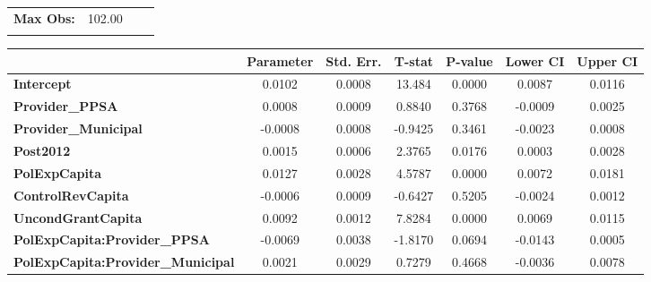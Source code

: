 \begin{center}
\begin{tabular}{lclc}
\textbf{Max Obs:}                                  &       102.00       & \textbf{                     }   &                  \\
\textbf{}                                          &                    & \textbf{                     }   &                  \\
\bottomrule
\end{tabular}
\begin{tabular}{lcccccc}
                                                   & \textbf{Parameter} & \textbf{Std. Err.} & \textbf{T-stat} & \textbf{P-value} & \textbf{Lower CI} & \textbf{Upper CI}  \\
\midrule
\textbf{Intercept}                                 &       0.0102       &       0.0008       &      13.484     &      0.0000      &       0.0087      &       0.0116       \\
\textbf{Provider\_PPSA}                            &       0.0008       &       0.0009       &      0.8840     &      0.3768      &      -0.0009      &       0.0025       \\
\textbf{Provider\_Municipal}                       &      -0.0008       &       0.0008       &     -0.9425     &      0.3461      &      -0.0023      &       0.0008       \\
\textbf{Post2012}                                  &       0.0015       &       0.0006       &      2.3765     &      0.0176      &       0.0003      &       0.0028       \\
\textbf{PolExpCapita}                              &       0.0127       &       0.0028       &      4.5787     &      0.0000      &       0.0072      &       0.0181       \\
\textbf{ControlRevCapita}                          &      -0.0006       &       0.0009       &     -0.6427     &      0.5205      &      -0.0024      &       0.0012       \\
\textbf{UncondGrantCapita}                         &       0.0092       &       0.0012       &      7.8284     &      0.0000      &       0.0069      &       0.0115       \\
\textbf{PolExpCapita:Provider\_PPSA}               &      -0.0069       &       0.0038       &     -1.8170     &      0.0694      &      -0.0143      &       0.0005       \\
\textbf{PolExpCapita:Provider\_Municipal}          &       0.0021       &       0.0029       &      0.7279     &      0.4668      &      -0.0036      &       0.0078       \\

\end{tabular}
\end{center}
